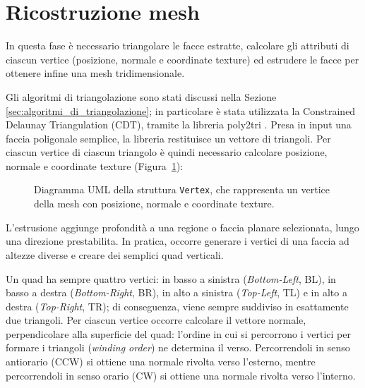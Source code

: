 \newpage
\section{Ricostruzione mesh}
\label{sec:ricostruzione_mesh}

In questa fase è necessario triangolare le facce estratte, calcolare gli attributi di ciascun vertice (posizione, normale e coordinate texture) ed estrudere le facce per ottenere infine una mesh tridimensionale.

Gli algoritmi di triangolazione sono stati discussi nella Sezione \ref{sec:algoritmi_di_triangolazione}; in particolare è stata utilizzata la Constrained Delaunay Triangulation (CDT), tramite la libreria poly2tri \cite{poly2tri}. Presa in input una faccia poligonale semplice, la libreria restituisce un vettore di triangoli. Per ciascun vertice di ciascun triangolo è quindi necessario calcolare posizione, normale e coordinate texture (Figura~\ref{fig:vertex-uml}):
\begin{figure}[H]
	\centering
	\caption{Diagramma UML della struttura \texttt{Vertex}, che rappresenta un vertice della mesh con posizione, normale e coordinate texture.}
	\label{fig:vertex-uml}
\end{figure}

L'estrusione aggiunge profondità a una regione o faccia planare selezionata, lungo una direzione prestabilita. In pratica, occorre generare i vertici di una faccia ad altezze diverse e creare dei semplici quad verticali.

Un quad ha sempre quattro vertici: in basso a sinistra (\emph{Bottom-Left}, BL), in basso a destra (\emph{Bottom-Right}, BR), in alto a sinistra (\emph{Top-Left}, TL) e in alto a destra (\emph{Top-Right}, TR); di conseguenza, viene sempre suddiviso in esattamente due triangoli. Per ciascun vertice occorre calcolare il vettore normale, perpendicolare alla superficie del quad: l'ordine in cui si percorrono i vertici per formare i triangoli (\emph{winding order}) ne determina il verso. Percorrendoli in senso antiorario (CCW) si ottiene una normale rivolta verso l'esterno, mentre percorrendoli in senso orario (CW) si ottiene una normale rivolta verso l'interno.


